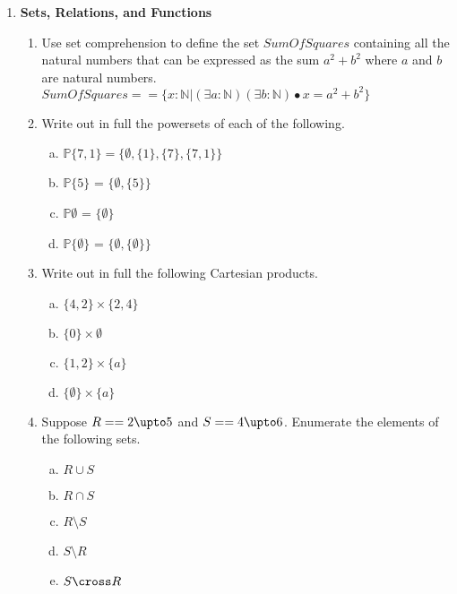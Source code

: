 \documentclass{article}
\newcommand{\define}{==}
\begin{document}

\begin{enumerate}[\bf I.]
\item \textbf{Sets, Relations, and Functions}
\begin{enumerate}[1.]
\item Use set comprehension to define the set $\mathit{SumOfSquares}$
containing all the natural numbers that can be expressed as the sum
$a^2 + b^2$ where $a$ and $b$ are natural numbers. \\
$SumOfSquares == \{x: \mathbb{N} | (\exists a : \mathbb{N}) (\exists b : \mathbb{N}) \bullet  x = a^2 + b^2 \}$ \\

\item Write out in full the powersets of each of the following.
\begin{enumerate}[a.]
\item $\mathbb{P}\{7,1\} = \{\emptyset, \{1\}, \{7\}, \{7,1\}\}$
\item $\mathbb{P}\{5\}$ = $\{\emptyset, \{5\}\}$
\item $\mathbb{P} \emptyset$ = $\{\emptyset\}$
\item $\mathbb{P}\{\emptyset\}$ = $\{\emptyset, \{\emptyset\}\}$
\end{enumerate}
\item Write out in full the following Cartesian products.
\begin{enumerate}[a.]
\item $\{4,2\}\times\{2,4\}$
\item $\{0\}\times\emptyset$
\item $\{1,2\}\times\{a\}$
\item $\{\emptyset\}\times\{a\}$
\end{enumerate}

\item Suppose $R \define 2 \upto 5$ and $S == 4 \upto 6$. Enumerate the elements of the following sets.

\begin{enumerate}[a.]
\item $R \cup S$
\item $R \cap S$
\item $R \setminus S$
\item $S \setminus R$
\item $S \cross R$
\end{enumerate}


\end{enumerate}
\end{enumerate}
\end{document}
